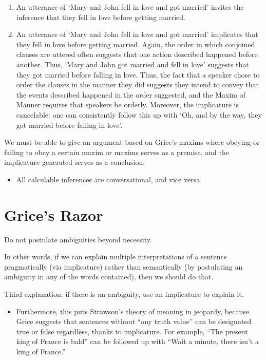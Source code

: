 \begin{example}\leavevmode
\begin{enumerate}
  \item An utterance of `Mary and John fell in love and got married' invites the inference that they fell in love before getting married.
  \item An utterance of `Mary and John fell in love and got married' implicates that they fell in love before getting married. Again, the order in which conjoined clauses are uttered often suggests that one action described happened before another. Thus, `Mary and John got married and fell in love' suggests that they got married before falling in love. Thus, the fact that a speaker chose to order the clauses in the manner they did suggests they intend to convey that the events described happened in the order suggested, and the Maxim of Manner requires that speakers be orderly. Moreover, the implicature is cancelable: one can consistently follow this up with `Oh, and by the way, they got married before falling in love'.
\end{enumerate}
\end{example}

\begin{definition}[Calculability]
We must be able to give an argument based on Grice's maxims where obeying or failing to obey a certain maxim or maxims serves as a premise, and the implicature generated serves as a conclusion.
\begin{itemize}
  \item All calculable inferences are conversational, and vice versa.
\end{itemize}
\end{definition}

\section{Grice's Razor}

\begin{definition}
Do not postulate ambiguities beyond necessity.
\end{definition}

In other words, if we can explain multiple interpretations of a sentence pragmatically (via implicature) rather than semantically (by postulating an ambiguity in any of the words contained), then we should do that.

Third explanation: if there is an ambiguity, use an implicature to explain it.
\begin{itemize}
  \item Furthermore, this puts Strawson's theory of meaning in jeopardy, because Grice suggests that sentences without ``any truth value'' can be designated true or false regardless, thanks to implicature. For example, ``The present king of France is bald'' can be followed up with ``Wait a minute, there isn't a king of France.''
\end{itemize}

